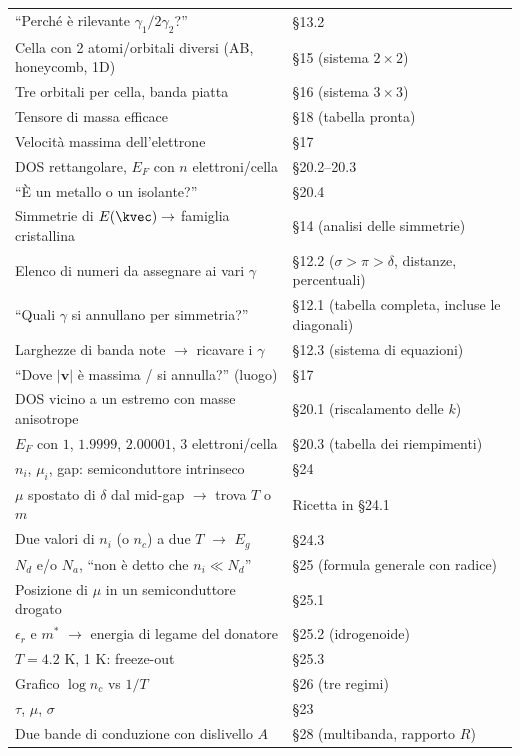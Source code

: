\begin{center}
{\begin{tabular}{p{7.4cm} p{9.6cm}}
``Perché è rilevante $\gamma_1/2\gamma_2$?'' & §13.2  \\
Cella con 2 atomi/orbitali diversi (AB, honeycomb, 1D) & §15 (sistema $2\times2$)  \\
Tre orbitali per cella, banda piatta & §16 (sistema $3\times3$)  \\
Tensore di massa efficace & §18 (tabella pronta)  \\
Velocità massima dell'elettrone & §17  \\
DOS rettangolare, $E_F$ con $n$ elettroni/cella & §20.2--20.3  \\
``È un metallo o un isolante?'' & §20.4  \\
Simmetrie di $E(\kvec)\to$ famiglia cristallina & §14 (analisi delle simmetrie)  \\
Elenco di numeri da assegnare ai vari $\gamma$ & §12.2 ($\sigma>\pi>\delta$, distanze, percentuali)  \\
``Quali $\gamma$ si annullano per simmetria?'' & §12.1 (tabella completa, incluse le diagonali)  \\
Larghezze di banda note $\to$ ricavare i $\gamma$ & §12.3 (sistema di equazioni)  \\
``Dove $|\mathbf{v}|$ è massima / si annulla?'' (luogo) & §17  \\
DOS vicino a un estremo con masse anisotrope & §20.1 (riscalamento delle $k$)  \\
$E_F$ con $1$, $1.9999$, $2.00001$, $3$ elettroni/cella & §20.3 (tabella dei riempimenti)  \\
\midrule
$n_i$, $\mu_i$, gap: semiconduttore intrinseco & §24  \\
$\mu$ spostato di $\delta$ dal mid-gap $\to$ trova $T$ o $m$ & Ricetta in §24.1  \\
Due valori di $n_i$ (o $n_c$) a due $T$ $\to$ $E_g$ & §24.3  \\
$N_d$ e/o $N_a$, ``non è detto che $n_i\ll N_d$'' & §25 (formula generale con radice)  \\
Posizione di $\mu$ in un semiconduttore drogato & §25.1  \\
$\epsilon_r$ e $m^*$ $\to$ energia di legame del donatore & §25.2 (idrogenoide)  \\
$T=4.2$ K, 1 K: freeze-out & §25.3  \\
Grafico $\log n_c$ vs $1/T$ & §26 (tre regimi)  \\
$\tau$, $\mu$, $\sigma$ & §23  \\
Due bande di conduzione con dislivello $A$ & §28 (multibanda, rapporto $R$)  \\
\bottomrule
\end{tabular}}
\end{center}

